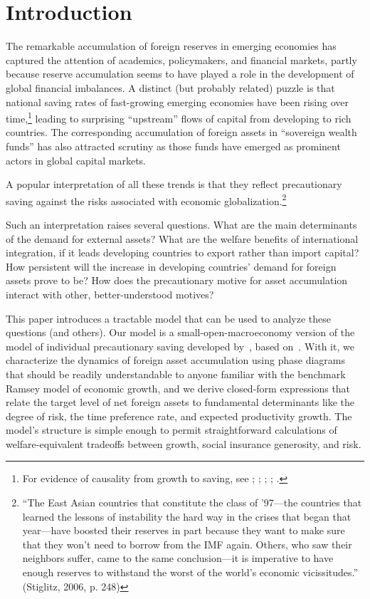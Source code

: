 \documentclass[titlepage,abstract,letterpaper]{econtex}
\begin{document}
\section{Introduction} 

The remarkable accumulation of foreign reserves in emerging
economies has captured the attention of academics, policymakers, and
financial markets, partly because reserve accumulation seems to have
played a role in the development of global financial imbalances.  A
distinct (but probably related) puzzle is that national saving rates
of fast-growing emerging economies have been rising over
time,\footnote{For evidence of causality from growth to saving, see
  \cite{carroll&weil:crcs}; \cite{lss:whatdrives}; \cite{aps:sgi};
  \cite{hprGrowth}; \cite{gourinchasJeannePuzzle}.} leading to
surprising ``upstream'' flows of capital from developing to rich
countries.  The corresponding accumulation of foreign assets in
``sovereign wealth funds'' has also attracted scrutiny as those
funds have emerged as prominent actors in global capital markets.

A popular interpretation of all these trends is that they
reflect precautionary saving against the risks associated with
economic globalization.\footnote{``The East Asian countries that constitute the class of '97---the countries that learned the lessons
of instability the hard way in the crises that began that year---have boosted their reserves in part because they want to make sure that they won't need
to borrow from the IMF again. Others, who saw their neighbors suffer, came to the same conclusion---it is imperative to have enough reserves
to withstand the worst of the world's economic vicissitudes.'' (Stiglitz, 2006, p. 248)}

Such an interpretation raises several questions. What are the main
determinants of the demand for external assets?  What are the welfare
benefits of international integration, if it leads developing
countries to export rather than import capital?  How persistent will
the increase in developing countries' demand for foreign assets
prove to be?  How does the precautionary motive for asset
accumulation interact with other, better-understood motives?

This paper introduces a tractable model that can be used to analyze
these questions (and others). Our model is a small-open-macroeconomy
version of the model of individual precautionary saving developed
by~\cite{carrollTractable}, based on~\cite{toche:urisk}. With it, 
we characterize the dynamics of foreign asset accumulation
using phase diagrams that should be readily understandable to anyone
familiar with the benchmark Ramsey model of economic growth, and we 
derive closed-form expressions that relate the target level of net
foreign assets to fundamental determinants like the degree of risk,
the time preference rate, and expected productivity growth.  The
model's structure is simple enough to permit straightforward
calculations of welfare-equivalent tradeoffs between growth, social
insurance generosity, and risk.
\end{document}
